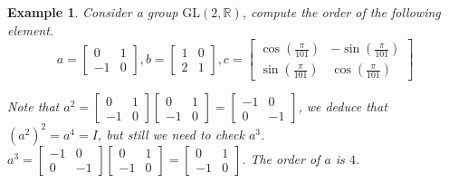 \documentclass{article}
\theoremstyle{MyNonumberplain}
\theoremstyle{break}
\theoremstyle{break}
\newtheorem{example}{Example}[section]
\theoremstyle{break}
\theoremstyle{definition}
\theoremstyle{break}
\begin{document}
\begin{expbox}
    \begin{example}
        Consider a group $\text{GL} (2, \mathbb{R})$, compute the order of the
        following element.
        \[ a = \left[\begin{array}{cc}
            0 & 1\\
            - 1 & 0
        \end{array}\right], b = \left[\begin{array}{cc}
            1 & 0\\
            2 & 1
        \end{array}\right], c = \left[\begin{array}{cc}
            \cos \left( \frac{\pi}{101} \right) & - \sin \left( \frac{\pi}{101}
            \right)\\
            \sin \left( \frac{\pi}{101} \right) & \cos \left( \frac{\pi}{101} \right)
        \end{array}\right] \]

        \begin{ansbox}
            Note that $a^2 = \left[\begin{array}{cc}
                0 & 1\\
                - 1 & 0
                \end{array}\right] \left[\begin{array}{cc}
                0 & 1\\
                - 1 & 0
                \end{array}\right] = \left[\begin{array}{cc}
                - 1 & 0\\
                0 & - 1
                \end{array}\right]$, we deduce that $(a^2)^2 = a^4 = I$, but still we
                need to check $a^3$. $a^3 = \left[\begin{array}{cc}
                - 1 & 0\\
                0 & - 1
                \end{array}\right] \left[\begin{array}{cc}
                0 & 1\\
                - 1 & 0
                \end{array}\right] = \left[\begin{array}{cc}
                0 & 1\\
                - 1 & 0
                \end{array}\right]$. The order of $a$ is $4$.\\\\
        

\end{ansbox}
\end{example}
\end{expbox}
\end{document}
